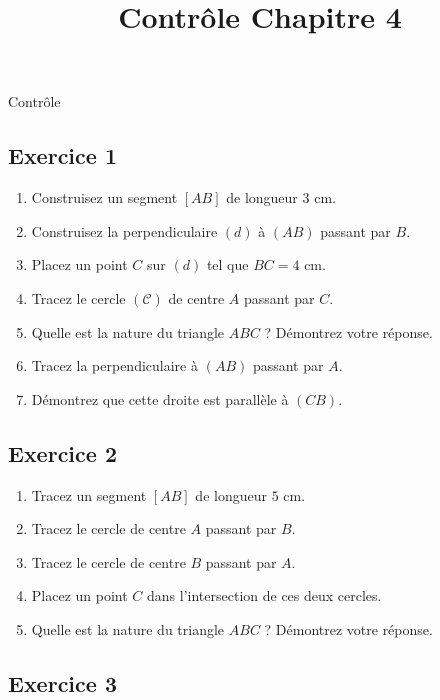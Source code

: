 \documentclass[12 pt]{extarticle}
\title{Contrôle Chapitre 4}
\date{}
\theoremstyle{plain}
\begin{document}
\begin{center}{\Large Contrôle}\\ 
 \end{center}
 
 \subsection*{Exercice 1}
 \begin{enumerate}
 \item Construisez un segment $[AB]$ de longueur $3$ cm. 
 
 
 \item Construisez la perpendiculaire $(d)$ à $(AB)$ passant par $B$.  
 \item Placez un point $C$ sur $(d)$ tel que $BC=4$ cm. 
	
 \item Tracez le cercle $(\mathcal C)$ de centre $A$ passant par $C$.
 
 \item Quelle est la nature du triangle $ABC$ ? Démontrez votre réponse. 
 
 \item Tracez la perpendiculaire à $(AB)$ passant par $A$. 
 
 \item Démontrez que cette droite est parallèle à $(CB)$. 
 
 
 \end{enumerate}
 \subsection*{Exercice 2}
 
 \begin{enumerate}
 \item Tracez un segment $[AB]$ de longueur $5$ cm. 
 
 \item Tracez le cercle de centre $A$ passant par $B$. 
 
 \item Tracez le cercle de centre $B$ passant par $A$. 
 
 \item Placez un point $C$ dans l'intersection de ces deux cercles. 
 
 \item Quelle est la nature du triangle $ABC$ ? Démontrez votre réponse. 
 \end{enumerate}
 
 
 \subsection*{Exercice 3}
 
\end{document}
